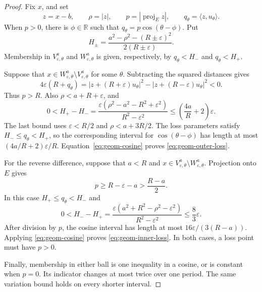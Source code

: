 \documentclass[10pt,a4paper]{amsart}
\def\R{\mathbb{R}}
\newcommand\inpro[2]{\langle #1,#2\rangle}
\newcommand\1{\mathbbm{1}}
\newcommand{\eps}{\varepsilon}
\begin{document}
\begin{proof}
Fix $x$, and set
\begin{equation*}
    z=x-b,\qquad \rho=|z|,\qquad p=|\operatorname{proj}_E z|,
    \qquad q_\theta=\inpro{z}{u_\theta}.
\end{equation*}
When $p>0$, there is $\phi\in\R$ such that
$q_\theta=p\cos(\theta-\phi)$. Put
\begin{equation*}
    H_\pm=\frac{a^2-\rho^2-(R\pm\eps)^2}{2(R\pm\eps)}.
\end{equation*}
Membership in $V_{\eps,\theta}^{a}$ and $W_{\eps,\theta}^{a}$ is given,
respectively, by $q_\theta<H_-$ and $q_\theta<H_+$.

Suppose that $x\in W_{\eps,\theta}^{a}\setminus V_{\eps,\theta}^{a}$
for some $\theta$. Subtracting the squared distances gives
\begin{equation*}
    4\eps(R+q_\theta)
    =|z+(R+\eps)u_\theta|^2-|z+(R-\eps)u_\theta|^2<0.
\end{equation*}
Thus $p>R$. Also $\rho<a+R+\eps$, and
\begin{equation}\label{eq:geom-threshold-width}
    0<H_+-H_-
    =\frac{\eps(\rho^2-a^2-R^2+\eps^2)}{R^2-\eps^2}
    \le\left(\frac{4a}{R}+2\right)\eps.
\end{equation}
The last bound uses $\eps<R/2$ and $\rho<a+3R/2$.
The loss parameters satisfy $H_-\le q_\theta<H_+$, so the corresponding
interval for $\cos(\theta-\phi)$ has length at most
$(4a/R+2)\eps/R$. Equation~\eqref{eq:geom-cosine} proves
\eqref{eq:geom-outer-loss}.

For the reverse difference, suppose that $a<R$ and
$x\in V_{\eps,\theta}^{a}\setminus W_{\eps,\theta}^{a}$.
Projection onto $E$ gives
\begin{equation*}
    p\ge R-\eps-a>\frac{R-a}{2}.
\end{equation*}
In this case $H_+\le q_\theta<H_-$ and
\begin{equation*}
    0<H_--H_+
    =\frac{\eps(a^2+R^2-\rho^2-\eps^2)}{R^2-\eps^2}
    \le\frac83\eps.
\end{equation*}
After division by $p$, the cosine interval has length at most
$16\eps/(3(R-a))$. Applying \eqref{eq:geom-cosine} proves
\eqref{eq:geom-inner-loss}. In both cases, a loss point must have $p>0$.

Finally, membership in either ball is one inequality in a cosine, or is
constant when $p=0$. Its indicator changes at most twice over one period.
The same variation bound holds on every shorter interval.
\end{proof}
\end{document}
